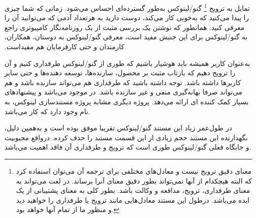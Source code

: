 تمایل به ترویج 
\footnote{
معنای دقیق  ترویج نیست و
معادل‌های مختلفی برای ترجمه آن می‌توان استفاده کرد که البته
هیچکدام از آنها نمی‌تواند بطور دقیق معنای آنرا برساند. 
در لغت می‌تواند به معنای طرفداری، ترویج، مدافعه و وکالت باشد.
بطور کلی  به معنای پشتیبانی از یک ایده می‌باشد.
درطول این مستند معادل‌هایی مانند ترویج یا طرفداری را خواهید دید
و منظور ما از تمام آنها  خواهد بود.
}
گنو/لینوکس به‌طور گسترده‌ای احساس می‌شود.
زمانی که شما چیزی را پیدا می‌کنید که ‫به‌خوبی کار می‌کند،
دوست دارید به هرتعداد آدمی که می‌توانید آن را معرفی کنید.
همانطور که نوشتن یک بررسی مثبت از یک روزنامه‌نگار کامپیوتری
راجع به گنو/لینوکس برای این جنبش مفید است، معرفی گنو/لینوکس
به دوستان، همکاران، کارمندان و حتی کارفرمایان هم مفیداست.

به‌عنوان کاربر همیشه باید هوشیار باشیم که طوری از گنو/لینوکس
طرفداری کنیم و آن را ترویج دهیم که بازتاب مثبت بر محصول،
سازنده‌ها، توسعه دهنده‌ها و حتی سایر کاربرها داشته باشد.
توجه داشته باشید که طرفداری هم می‌تواند سازنده باشد و هم می‌تواند
صرفا بهانه‌گیری منفی و غیر سازنده باشد.
در
موجود می‌باشد و پیشنهادهای بسیار کمک کننده ای ارائه می‌دهد.
پروژه دیگری مشابه پروژه مستندسازی لینوکس، به نام 
وجود دارد که کار
می‌باشد.



در طول‌عمر زیاد این مستند گنو/لینوکس تقریبا موفق بوده است و به‌همین دلیل،
نگهدارنده این مستند حجم زیادی از این قسمت مستند را حذف کرده. درواقع
محبوبیت و جایگاه فعلی گنو/لینوکس طوری است که ترویج و طرفداری آن فاقد اهمیت می‌باشد.

